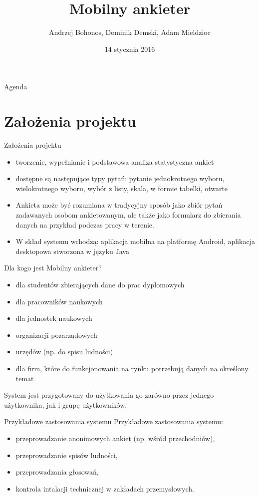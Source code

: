 \documentclass[a4paper,10pt]{beamer}
\date{14 stycznia 2016}
\title{Mobilny ankieter}
\author[A. Bohonos, D. Demski, A. Mieldzioc]{Andrzej Bohonos, Dominik Demski, Adam Mieldzioc}
\begin{document}
		\begin{frame}
			\titlepage
		\end{frame}
		\begin{frame}{Agenda}
			\tableofcontents
		\end{frame}
		
		\section{Założenia projektu}
		\begin{frame}{Założenia projektu}
	
			\begin{itemize}
				\item tworzenie, wypełnianie i podstawowa analiza statystyczna ankiet
				\item dostępne są następujące typy pytań: pytanie jednokrotnego wyboru, wielokrotnego wyboru, wybór z listy, skala, w formie tabelki, otwarte
				\item Ankieta może być rozumiana w tradycyjny sposób jako zbiór pytań zadawanych osobom ankietowanym, ale także jako formularz do zbierania danych na przykład podczas pracy w terenie. 
				\item W skład systemu wchodzą: aplikacja mobilna na platformę Android, aplikacja desktopowa stworzona w języku Java
			\end{itemize}
		\end{frame}
		\begin{frame}{Dla kogo jest Mobilny ankieter?}
			
			\begin{itemize}
				\item dla studentów zbierających dane do prac dyplomowych 
				\item dla pracowników naukowych
				\item  dla jednostek naukowych
				\item organizacji pozarządowych
				\item  urzędów (np. do spisu ludności)
				 \item dla firm, które do funkcjonowania na rynku potrzebują danych na określony temat
			\end{itemize}
			 System jest przygotowany do użytkowania go zarówno przez jednego użytkownika, jak i grupę użytkowników.
		\end{frame}
		
		
		\begin{frame}{Przykładowe zastosowania systemu}
			Przykładowe zastosowania systemu:
			\begin{itemize}
				\item przeprowadzanie anonimowych ankiet (np. wśród przechodniów),
				\item przeprowadzanie spisów ludności,
				\item przeprowadzania głosowań,
				\item kontrola intalacji technicznej w zakładach przemysłowych.
			\end{itemize}
		\end{frame}
	
\end{document}
